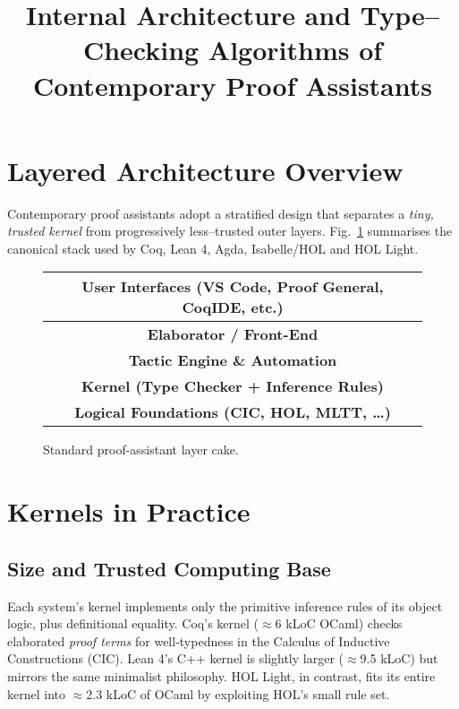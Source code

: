 \documentclass[11pt,a4paper]{article}
\title{Internal Architecture and Type--Checking Algorithms of Contemporary Proof Assistants}
\author{}
\date{}
\begin{document}
\maketitle
\vspace{-2em} %

\section{Layered Architecture Overview}
Contemporary proof assistants adopt a stratified design that separates a \emph{tiny, trusted kernel} from progressively less–trusted outer layers.  Fig.~\ref{fig:layers} summarises the canonical stack used by Coq, Lean 4, Agda, Isabelle/HOL and HOL Light\cite{coq-arch,isabelle-manual,hollight-tut,lean4-survey,agda-note}.  

\begin{figure}[h]
\centering
\begin{tabular}{|c|}
\hline
\textbf{User Interfaces} (VS Code, Proof General, CoqIDE, etc.) \\\hline
\textbf{Elaborator / Front-End}\\
\hline
\textbf{Tactic Engine \& Automation}\\
\hline
\textbf{Kernel (Type Checker + Inference Rules)}\\
\hline
\textbf{Logical Foundations (CIC, HOL, MLTT, …)}\\
\hline
\end{tabular}
\caption{Standard proof-assistant layer cake.}
\label{fig:layers}
\end{figure}

\section{Kernels in Practice}
\subsection{Size and Trusted Computing Base}
Each system’s kernel implements only the primitive inference rules of its object logic, plus definitional equality.  
Coq’s kernel (\(\approx\)6 kLoC OCaml) checks elaborated \emph{proof terms} for well-typedness in the Calculus of Inductive Constructions (CIC)\cite{coq-arch}.  
Lean 4’s C++ kernel is slightly larger (\(\approx\)9.5 kLoC) but mirrors the same minimalist philosophy\cite{lean4-survey}.  
HOL Light, in contrast, fits its entire kernel into \(\approx\)2.3 kLoC of OCaml by exploiting HOL’s small rule set\cite{hollight-tut}.  
\end{document}
